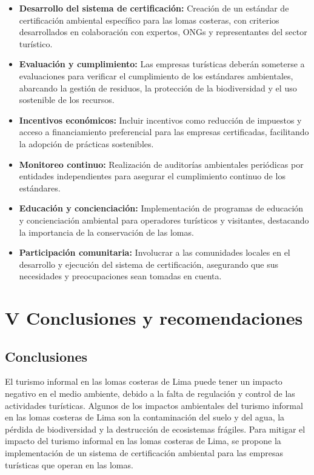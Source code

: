 \documentclass[a4paper,11pt]{article}
\begin{document}
\begin{itemize}
  \item \textbf{Desarrollo del sistema de certificación:} Creación de un estándar de certificación ambiental específico para las lomas costeras, con criterios desarrollados en colaboración con expertos, ONGs y representantes del sector turístico.
  \item \textbf{Evaluación y cumplimiento:} Las empresas turísticas deberán someterse a evaluaciones para verificar el cumplimiento de los estándares ambientales, abarcando la gestión de residuos, la protección de la biodiversidad y el uso sostenible de los recursos.

\item \textbf{Incentivos económicos:} Incluir incentivos como reducción de impuestos y acceso a financiamiento preferencial para las empresas certificadas, facilitando la adopción de prácticas sostenibles.

\item \textbf{Monitoreo continuo:} Realización de auditorías ambientales periódicas por entidades independientes para asegurar el cumplimiento continuo de los estándares.

\item \textbf{Educación y concienciación:} Implementación de programas de educación y concienciación ambiental para operadores turísticos y visitantes, destacando la importancia de la conservación de las lomas.

\item \textbf{Participación comunitaria:} Involucrar a las comunidades locales en el desarrollo y ejecución del sistema de certificación, asegurando que sus necesidades y preocupaciones sean tomadas en cuenta.
\end{itemize}

\section{V Conclusiones y recomendaciones}
\subsection{Conclusiones}
El turismo informal en las lomas costeras de Lima puede tener un impacto negativo en el medio ambiente, debido a la falta de regulación y control de las actividades turísticas. Algunos de los impactos ambientales del turismo informal en las lomas costeras de Lima son la contaminación del suelo y del agua, la pérdida de biodiversidad y la destrucción de ecosistemas frágiles. Para mitigar el impacto del turismo informal en las lomas costeras de Lima, se propone la implementación de un sistema de certificación ambiental para las empresas turísticas que operan en las lomas.
\end{document}
